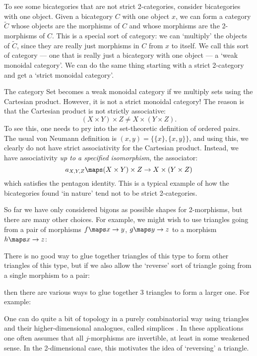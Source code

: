 To see some bicategories that are not strict 2-categories, consider
bicategories with one object.  Given a bicategory $C$ with one object
$x$, we can form a category $\tilde C$ whose objects are the morphisms
of $C$ and whose morphisms are the 2-morphisms of $C$.  This is a
special sort of category: we can `multiply' the objects of $\tilde C$,
since they are really just morphisms in $C$ from $x$ to itself.  We call
this sort of category --- one that is really just a bicategory with one
object --- a `weak monoidal category'.  We can do the same thing
starting with a strict 2-category and get a `strict monoidal category'.

The category Set becomes a weak monoidal category if we multiply sets 
using the Cartesian product.  However, it is not a strict monoidal
category!  The reason is that the Cartesian product is not strictly
associative:
\[               (X \times Y) \times Z \ne X \times (Y \times Z) .\]
To see this, one needs to pry into the set-theoretic definition of
ordered pairs.  The usual von Neumann definition is $(x,y) = \{\{x\},
\{x,y\}\}$, and using this, we clearly do not have strict associativity
for the Cartesian product.  Instead, we have associativity {\it up to
a specified isomorphism}, the associator:
\[       a_{X,Y,Z} \maps (X \times Y) \times Z \to X \times (Y \times Z)
\]
which satisfies the pentagon identity.  This is a typical example of
how the bicategories found `in nature' tend not to be strict 2-categories. 

So far we have only considered bigons as possible shapes for
2-morphisms, but there are many other choices.  For example, we might
wish to use triangles going from a pair of morphisms $f \maps x \to y$,
$g \maps y \to z$ to a morphism $h \maps x \to z$:

\medskip
\centerline{\epsfysize=1.2in}
\medskip

\noindent  There is no good way to glue together triangles of
this type to form other triangles of this type, but if we also 
allow the `reverse' sort of triangle going from a single morphism 
to a pair: 

\medskip
\centerline{\epsfysize=1.2in}
\medskip

\noindent then there are various ways to glue together 3 triangles to
form a larger one.  For example:

\medskip
\centerline{\epsfysize=1.2in}
\medskip

\noindent One can do quite a bit of topology in a purely combinatorial
way using triangles and their higher-dimensional analogues, called
simplices \cite{May}.  In these applications one often assumes that all
$j$-morphisms are invertible, at least in some weakened sense.  In the
2-dimensional case, this motivates the idea of `reversing' a triangle.

